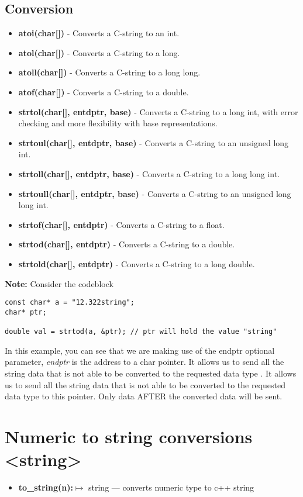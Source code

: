 \documentclass{report}
\begin{document}
    \subsection{Conversion}
    \begin{itemize}
        \item \textbf{atoi(char[])} - Converts a C-string to an int.
        \item \textbf{atol(char[])} - Converts a C-string to a long.
        \item \textbf{atoll(char[])} - Converts a C-string to a long long.
        \item \textbf{atof(char[])} - Converts a C-string to a double.
        \item \textbf{strtol(char[], entdptr, base)} - Converts a C-string to a long int, with error checking and more flexibility with base representations.
        \item \textbf{strtoul(char[], entdptr, base)} - Converts a C-string to an unsigned long int.
        \item \textbf{strtoll(char[], entdptr, base)} - Converts a C-string to a long long int.
        \item \textbf{strtoull(char[], entdptr, base)} - Converts a C-string to an unsigned long long int.
        \item \textbf{strtof(char[], entdptr)} - Converts a C-string to a float.
        \item \textbf{strtod(char[], entdptr)} - Converts a C-string to a double.
        \item \textbf{strtold(char[], entdptr)} - Converts a C-string to a long double.
    \end{itemize}
    \bigbreak \noindent 
    \textbf{Note:} Consider the codeblock
    \begin{verbatim}
const char* a = "12.322string";
char* ptr;

double val = strtod(a, &ptr); // ptr will hold the value "string"
    \end{verbatim}
    \bigbreak \noindent 
    In this example, you can see that we are making use of the endptr optional parameter, \textit{endptr} is the address to a char pointer. It allows us to send all the string data that is not able to be converted to the requested data type . It allows us to send all the string data that is not able to be converted to the requested data type to this pointer. Only data AFTER the converted data will be sent.

    
    \pagebreak \bigbreak \noindent 
    \section{\LARGE Numeric to string conversions <string>}
    \bigbreak \noindent 
    \begin{itemize}
        \item \textbf{to\_string(n):}$\mapsto$ string --- converts numeric type to c++ string
    \end{itemize}
\end{document}
